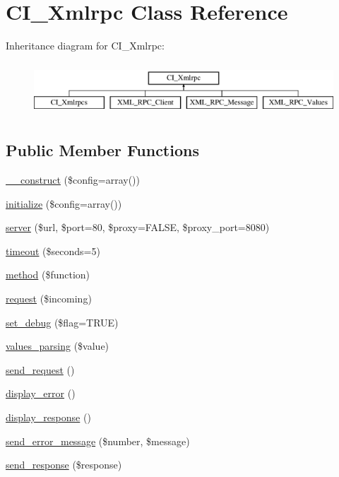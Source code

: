 \hypertarget{class_c_i___xmlrpc}{}\section{C\+I\+\_\+\+Xmlrpc Class Reference}
\label{class_c_i___xmlrpc}
Inheritance diagram for C\+I\+\_\+\+Xmlrpc\+:\begin{figure}[H]
\begin{center}
\leavevmode
\includegraphics[height=2.000000cm]{class_c_i___xmlrpc}
\end{center}
\end{figure}
\subsection*{Public Member Functions}
\begin{DoxyCompactItemize}
\item 
\mbox{\hyperlink{class_c_i___xmlrpc_aacd36988a211d86047f6268894214cdf}{\+\_\+\+\_\+construct}} (\$config=array())
\item 
\mbox{\hyperlink{class_c_i___xmlrpc_a83fa0b35866492f9a6fb8c092179a691}{initialize}} (\$config=array())
\item 
\mbox{\hyperlink{class_c_i___xmlrpc_a533c88bfc6c8e268d9dfc9226dbd9b40}{server}} (\$url, \$port=80, \$proxy=F\+A\+L\+SE, \$proxy\+\_\+port=8080)
\item 
\mbox{\hyperlink{class_c_i___xmlrpc_ad6355d060369ed4bebf4acc7aea3b81f}{timeout}} (\$seconds=5)
\item 
\mbox{\hyperlink{class_c_i___xmlrpc_afd0597e1ae50c9e3ff42d23dcff82f71}{method}} (\$function)
\item 
\mbox{\hyperlink{class_c_i___xmlrpc_a55d527599e6e84ef0367fe66fb8e06f4}{request}} (\$incoming)
\item 
\mbox{\hyperlink{class_c_i___xmlrpc_a7aa099ef76973ec0dca3af5103a3bbe1}{set\+\_\+debug}} (\$flag=T\+R\+UE)
\item 
\mbox{\hyperlink{class_c_i___xmlrpc_a44b4fc10779a9a668bf47e62c128217c}{values\+\_\+parsing}} (\$value)
\item 
\mbox{\hyperlink{class_c_i___xmlrpc_a703724d63bd3447ffa07547f714bbfb7}{send\+\_\+request}} ()
\item 
\mbox{\hyperlink{class_c_i___xmlrpc_ae7cd0677aea4a271ea7920d706d61e8c}{display\+\_\+error}} ()
\item 
\mbox{\hyperlink{class_c_i___xmlrpc_a23c437933e7812b2bada9af7069e4f51}{display\+\_\+response}} ()
\item 
\mbox{\hyperlink{class_c_i___xmlrpc_ad9cd573b1ae2455194027896aa46f4b7}{send\+\_\+error\+\_\+message}} (\$number, \$message)
\item 
\mbox{\hyperlink{class_c_i___xmlrpc_af310e360266a91ba728916440c192c5b}{send\+\_\+response}} (\$response)
\end{DoxyCompactItemize}
